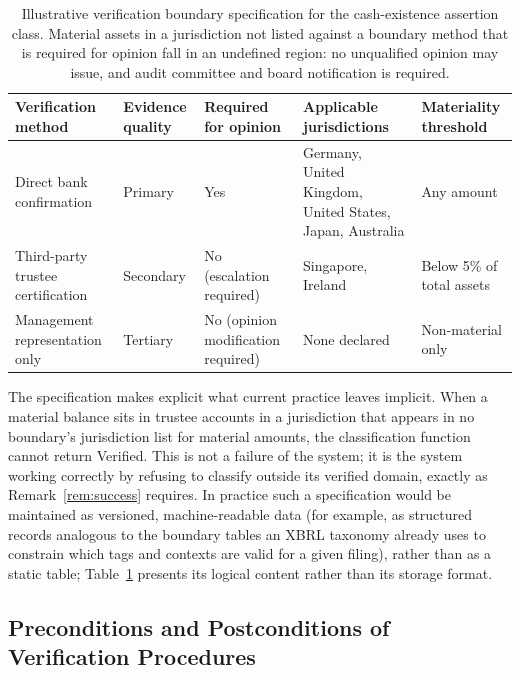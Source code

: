 \documentclass[11pt,a4paper]{article}
\theoremstyle{definition}
\theoremstyle{remark}
\begin{document}
\begin{table}[htbp]
\centering
\small
\begin{tabular}{>{\raggedright\arraybackslash}p{2.6cm}>{\raggedright\arraybackslash}p{2.6cm}>{\raggedright\arraybackslash}p{1.6cm}>{\raggedright\arraybackslash}p{3.2cm}>{\raggedright\arraybackslash}p{2.6cm}}
\toprule
\textbf{Verification method} & \textbf{Evidence quality} & \textbf{Required for opinion} & \textbf{Applicable jurisdictions} & \textbf{Materiality threshold} \\
\midrule
Direct bank confirmation & Primary & Yes & Germany, United Kingdom, United States, Japan, Australia & Any amount \\
\addlinespace
Third-party trustee certification & Secondary & No (escalation required) & Singapore, Ireland & Below 5\% of total assets \\
\addlinespace
Management representation only & Tertiary & No (opinion modification required) & None declared & Non-material only \\
\bottomrule
\end{tabular}
\caption{Illustrative verification boundary specification for the cash-existence assertion class. Material assets in a jurisdiction not listed against a boundary method that is required for opinion fall in an undefined region: no unqualified opinion may issue, and audit committee and board notification is required.}
\label{tab:boundaryspec}
\end{table}

The specification makes explicit what current practice leaves implicit. When a material balance sits in trustee accounts in a jurisdiction that appears in no boundary's jurisdiction list for material amounts, the classification function cannot return \textsf{Verified}. This is not a failure of the system; it is the system working correctly by refusing to classify outside its verified domain, exactly as Remark~\ref{rem:success} requires. In practice such a specification would be maintained as versioned, machine-readable data (for example, as structured records analogous to the boundary tables an XBRL taxonomy already uses to constrain which tags and contexts are valid for a given filing), rather than as a static table; Table~\ref{tab:boundaryspec} presents its logical content rather than its storage format.

\subsection{Preconditions and Postconditions of Verification Procedures}
\label{sec:preconditions}
\end{document}
